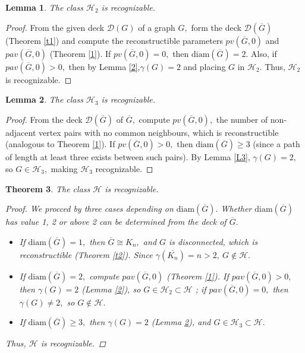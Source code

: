 \documentclass[11pt,oneside]{article}
\newtheorem{thm}{Theorem}
\newtheorem{lem}[thm]{Lemma}
\theoremstyle{definition}
\begin{document}
\begin{lem}\label{l2}
The class $\mathscr{H}_2$ is recognizable. 
\end{lem} 
\begin{proof}  
From the given deck $\mathscr{D}(G)$ of a graph $G,$ form the deck  $ \mathscr{D}(\overline{G})$ (Theorem \ref{t1}) and compute the reconstructible parameters  $pv(\overline{G},0)$ and $pav(\overline{G},0)$ (Theorem \ref{1}). If $pv(\overline{G},0)=0,$ then $\text{diam}(\overline{G})=2.$ Also, if $pav(\overline{G},0)>0,$ then by Lemma \ref{2},$\gamma(G)=2$ and placing $G$ in  $\mathscr{H}_2.$ Thus, $\mathscr{H}_2$ is recognizable. 
\end{proof}



\begin{lem}\label{14}
The class $\mathscr{H}_3$ is recognizable.
\end{lem}
\begin{proof}
From the deck $\mathscr{D}(\overline{G})$ of $\overline{G},$ compute $pv(\overline{G},0),$ the number of non-adjacent vertex pairs with no common neighbours, which is reconstructible (analogous to Theorem \ref{1}). If  $pv(\overline{G},0)>0,$ then $\text{diam}(\overline{G}) \geq 3$ (since a path of length at least three exists between such pairs). By Lemma \ref{L3},  $\gamma(G)=2,$ so $G \in \mathscr{H}_3,$ making $\mathscr{H}_3$ recognizable.
\end{proof}


\begin{thm} \label{HR}
The class $\mathscr{H}$ is recognizable.
\begin{proof}
 We procced by three cases depending on $\text{diam}(\overline{G}).$  Whether $\text{diam}(\overline{G})$ has value 1, 2 or above 2 can be determined from the deck of $\overline{G}.$ 
\begin{itemize}
\item If $\text{diam}(\overline{G})=1,$ then $\overline{G} \cong K_n,$ and $G$ is disconnected, which is reconstructible (Theorem \ref{t2}). Since $\gamma(\overline{K_n}) =n>2,~ G \notin \mathscr{H}.$
\item If $\text{diam}(\overline{G})=2,$ compute $pav(\overline{G},0)$ (Theorem \ref{1}). If $pav(\overline{G},0)>0,$ then $\gamma(G)=2$ (Lemma \ref{2}), so $ G \in \mathscr{H}_2 \subset \mathscr{H}$ ;  if $pav(\overline{G},0)=0,$ then  $\gamma(G) \neq 2,$ so $ G \notin \mathscr{H}.$
 \item If $\text{diam}(\overline{G})\geq 3,$ then $\gamma(G)=2$ (Lemma \ref{14}), and $ G \in \mathscr{H}_3 \subset \mathscr{H}.$
\end{itemize}
 Thus, $\mathscr{H}$ is recognizable. 

\end{proof}
\end{thm}
\end{document}
